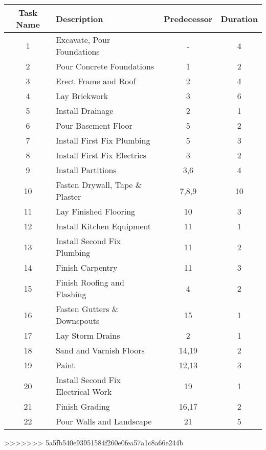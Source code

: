 \begin{tabular}{|c|l|c|c|}
	\hline 
	\textbf{Task Name} & \textbf{Description} & \textbf{Predecessor} & \textbf{Duration} \\ 
	\hline 
	
	1	& Excavate, Pour Foundations &	-	&4\\\hline 
	2	& Pour Concrete Foundations		&1	&2\\\hline 
	3	& Erect Frame and Roof			&2	&4\\\hline 
	4	& Lay Brickwork					&3	&6\\\hline 
	5	& Install Drainage				&2	&1\\\hline 
	6	& Pour Basement Floor			&5	&2\\\hline 
	7	& Install First Fix Plumbing		&5	&3\\\hline 
	8	& Install First Fix Electrics	&3	&2\\\hline 
	9	& Install Partitions				&3,6	&4\\\hline
	10	& Fasten Drywall, Tape \& Plaster	&7,8,9	&10\\\hline 
	11	& Lay Finished Flooring			&10	&3\\\hline 
	12	& Install Kitchen Equipment		&11	&1\\\hline 
	13	& Install Second Fix Plumbing	&11	&2\\\hline 
	14	& Finish Carpentry				&11	&3\\\hline
	15	& Finish Roofing and Flashing	&4	&2\\\hline 
	16	& Fasten Gutters \& Downspouts	&15	&1\\\hline 
	17	& Lay Storm Drains				&2	&1\\\hline 
	18	& Sand and Varnish Floors		&14,19	&2\\\hline 
	19	& Paint							&12,13	&3\\\hline 
	20	& Install Second Fix Electrical Work	&19	&1\\\hline 
	21	& Finish Grading					&16,17	&2 \\\hline
	22	& Pour Walls and Landscape		&21	&5 \\
	\hline 
	 
\end{tabular} 

>>>>>>> 5a5fb540e93951584f260e0fea57a1c8a66e244b



